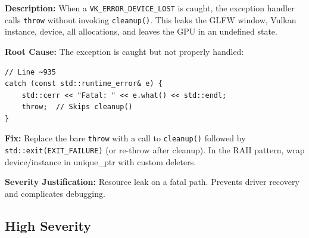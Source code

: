 \documentclass[a4paper,12pt]{article}
\begin{document}
\begin{enumerate}[leftmargin=*]
  \textbf{Description:}
  When a \texttt{VK\_ERROR\_DEVICE\_LOST} is caught, the exception handler calls
  \texttt{throw} without invoking \texttt{cleanup()}. This leaks the GLFW window,
  Vulkan instance, device, all allocations, and leaves the GPU in an undefined state.

  \textbf{Root Cause:}
  The exception is caught but not properly handled:

\begin{lstlisting}
// Line ~935
catch (const std::runtime_error& e) {
    std::cerr << "Fatal: " << e.what() << std::endl;
    throw;  // Skips cleanup()
}
\end{lstlisting}

  \textbf{Fix:}
  Replace the bare \texttt{throw} with a call to \texttt{cleanup()} followed by
  \texttt{std::exit(EXIT\_FAILURE)} (or re-throw after cleanup). In the RAII
  pattern, wrap device/instance in unique\_ptr with custom deleters.

  \textbf{Severity Justification:} Resource leak on a fatal path. Prevents
  driver recovery and complicates debugging.

\end{enumerate}

\subsection{High Severity}
\end{document}
